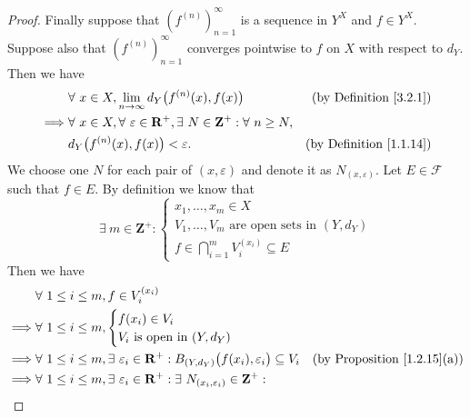 \begin{proof}
    Finally suppose that \((f^{(n)})_{n = 1}^\infty\) is a sequence in \(Y^X\) and \(f \in Y^X\).
    Suppose also that \((f^{(n)})_{n = 1}^\infty\) converges pointwise to \(f\) on \(X\) with respect to \(d_Y\).
    Then we have
    \begin{align*}
                 & \forall\ x \in X, \lim_{n \to \infty} d_Y\big(f^{(n)}(x), f(x)\big)                                       & \text{(by Definition \ref{3.2.1})}  \\
        \implies & \forall\ x \in X, \forall\ \varepsilon \in \mathbf{R}^+, \exists\ N \in \mathbf{Z}^+ : \forall\ n \geq N,                                       \\
                 & d_Y\big(f^{(n)}(x), f(x)\big) < \varepsilon.                                                              & \text{(by Definition \ref{1.1.14})}
    \end{align*}
    We choose one \(N\) for each pair of \((x, \varepsilon)\) and denote it as \(N_{(x, \varepsilon)}\).
    Let \(E \in \mathcal{F}\) such that \(f \in E\).
    By definition we know that
    \[
        \exists\ m \in \mathbf{Z}^+ : \begin{cases}
            x_1, \dots, x_m \in X                              \\
            V_1, \dots, V_m \text{ are open sets in } (Y, d_Y) \\
            f \in \bigcap_{i = 1}^m V_i^{(x_i)} \subseteq E
        \end{cases}
    \]
    Then we have
    \begin{align*}
                 & \forall\ 1 \leq i \leq m, f \in V_i^{(x_i)}                                                                                                                                        \\
        \implies & \forall\ 1 \leq i \leq m, \begin{cases}
            f(x_i) \in V_i \\
            V_i \text{ is open in } (Y, d_Y)
        \end{cases}                                                                                                                               \\
        \implies & \forall\ 1 \leq i \leq m, \exists\ \varepsilon_i \in \mathbf{R}^+ : B_{(Y, d_Y)}\big(f(x_i), \varepsilon_i\big) \subseteq V_i            & \text{(by Proposition \ref{1.2.15}(a))} \\
        \implies & \forall\ 1 \leq i \leq m, \exists\ \varepsilon_i \in \mathbf{R}^+ : \exists\ N_{(x_i, \varepsilon_i)} \in \mathbf{Z}^+ :                                                           \\

\end{align*}
\end{proof}
